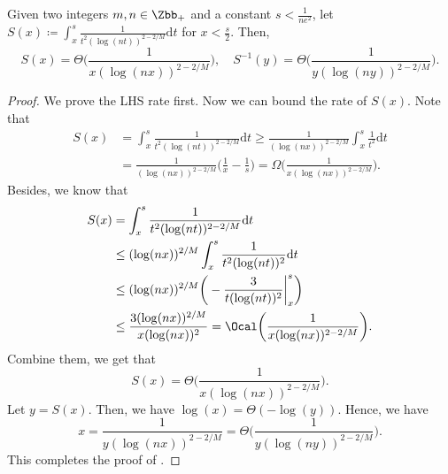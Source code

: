 \begin{lemma} 
\label{lem:int-log-2}
Given two integers $m,n \in \Zbb_+$ and a constant $s<\frac{1}{n e^2}$, let $S(x) \coloneqq \int_x^s \frac{1}{t^2(\log (n t))^{2-2/M}} \mathrm{d} t$ for $x<\frac{s}{2}$. Then, 
\[
    S(x) = \Theta \bigg( \frac{1}{ x(\log (n x))^{2-2/M}} \bigg), \quad S^{-1}(y) = \Theta \bigg( \frac{1}{ y(\log (n y))^{2-2/M}} \bigg). 
\]
\end{lemma}
\begin{proof}
We prove the LHS rate first. 
 Now we can bound the rate of $S(x)$. Note that
\begin{align*}
    S(x) &= \int_x^s \frac{1}{t^2(\log (n t))^{2-2/M}} \mathrm{d} t 
    \ge   \frac{1}{(\log (n x))^{2-2/M}} \int_x^s \frac{1}{t^2} \mathrm{d} t \\ 
    & = \frac{1}{(\log (n x))^{2-2/M}} \bigg( \frac{1}{x} - \frac{1}{s} \bigg) = \Omega \bigg( \frac{1}{x(\log (n x))^{2-2/M}} \bigg).
\end{align*}
Besides, we know that 
\begin{align*}
    S(x) &= \int_x^s \frac{1}{t^2(\log (n t))^{2-2/M}} \mathrm{d} t \\ 
    &\le (\log(nx))^{2/M} \int_x^s \frac{1}{t^2 (\log (n t))^{2}} \mathrm{d} t \\
    &\le  (\log(nx))^{2/M} \bigg( -\frac{3}{t(\log (n t))^2} \bigg|_x^s \bigg) \\
    &\le  \frac{3(\log(nx))^{2/M}}{x(\log (n x))^2} = \Ocal \bigg( \frac{1}{x(\log (n x))^{2-2/M}} \bigg).
\end{align*}
Combine them, we get that 
\[
S(x) = \Theta \bigg( \frac{1}{x(\log (n x))^{2-2/M}} \bigg).
\] 
Let $y = S(x)$. Then, we have $ \log(x) = \Theta(-\log(y))$. Hence, we have 
\[
x = \frac{1}{y (\log (n x))^{2-2/M}}  = \Theta \bigg( \frac{1}{y(\log (n y))^{2-2/M}} \bigg).
\] 
This completes the proof of .

\end{proof}

